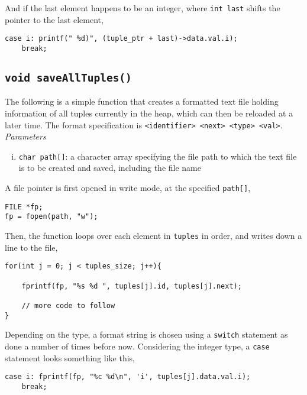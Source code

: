 \documentclass[10pt, a4paper, oneside]{memoir}
\begin{document}
	And if the last element happens to be an integer, where \texttt{int last} shifts the pointer to the last element,
\begin{verbatim}
case i: printf(" %d)", (tuple_ptr + last)->data.val.i);
	break;
\end{verbatim}

	\subsection{\texttt{void saveAllTuples()}}
	
	The following is a simple function that creates a formatted text file holding information of all tuples currently in the heap, which can then be reloaded at a later time. The format specification is \texttt{<identifier> <next> <type> <val>\n}.\\
	
	\textit{Parameters}
	\begin{enumerate}[i.]
		\item \texttt{char path[]}: a character array specifying the file path to which the text file is to be created and saved, including the file name
	\end{enumerate}
	
	A file pointer is first opened in write mode, at the specified \texttt{path[]},
\begin{verbatim}
FILE *fp;
fp = fopen(path, "w");
\end{verbatim}

	Then, the function loops over each element in \texttt{tuples} in order, and writes down a line to the file,
\begin{verbatim}
for(int j = 0; j < tuples_size; j++){

	fprintf(fp, "%s %d ", tuples[j].id, tuples[j].next);
	
	// more code to follow
}
\end{verbatim}

	Depending on the type, a format string is chosen using a \texttt{switch} statement as done a number of times before now. Considering the integer type, a \texttt{case} statement looks something like this,
\begin{verbatim}
case i: fprintf(fp, "%c %d\n", 'i', tuples[j].data.val.i);
	break;
\end{verbatim}
\end{document}
